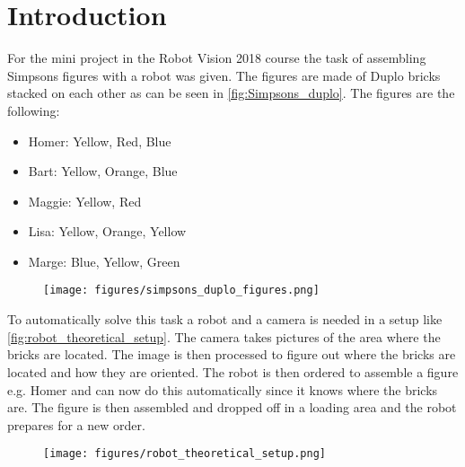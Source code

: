 \chapter{Introduction}
For the mini project in the Robot Vision 2018 course the task of assembling Simpsons figures with a robot was given. The figures are made of \lego Duplo bricks stacked on each other as can be seen in \autoref{fig:Simpsons_duplo}. The figures are the following:

\begin{itemize}
\item Homer: Yellow, Red, Blue
\item Bart: Yellow, Orange, Blue
\item Maggie: Yellow, Red
\item Lisa: Yellow, Orange, Yellow
\item Marge: Blue, Yellow, Green
\end{itemize}

\begin{figure}[h]
\centering
\texttt{[image: figures/simpsons\_duplo\_figures.png]}
\caption{}
\label{fig:Simpsons_duplo}
\end{figure}

To automatically solve this task a robot and a camera is needed in a setup like \autoref{fig:robot_theoretical_setup}. The camera takes pictures of the area where the bricks are located. The image is then processed to figure out where the bricks are located and how they are oriented. The robot is then ordered to assemble a figure e.g. Homer and can now do this automatically since it knows where the bricks are. The figure is then assembled and dropped off in a loading area and the robot prepares for a new order. 

\begin{figure}[h]
\centering
\texttt{[image: figures/robot\_theoretical\_setup.png]}
\caption{}
\label{fig:robot_theoretical_setup}
\end{figure}